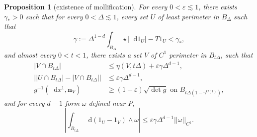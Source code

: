 \documentclass[reqno,12pt,letterpaper]{amsart}
\newcommand*\dif{\mathop{}\!\mathrm{d}}
\newcommand{\normal}{\mathbf n}
\newtheorem{proposition}[theorem]{Proposition}
\theoremstyle{definition}
\numberwithin{equation}{section}
\begin{document}
\begin{proposition}[existence of mollification]\label{mollifier quant}
For every $0 < \varepsilon \lesssim 1$, there exists $\gamma_* > 0$ such that for every $0 < \Delta \lesssim 1$, every set $U$ of least perimeter in $B_\Delta$ such that
\begin{equation}\label{bootstrap the mollifier}
\gamma := \Delta^{1 - d} \int_{B_\Delta} \star |\dif 1_U| - T1_U < \gamma_*,
\end{equation}
and almost every $0 < t < 1$, there exists a set $V$ of $C^1$ perimeter in $B_{t\Delta}$, such that
\begin{align}
|V \cap B_{t\Delta}| &\leq \eta(V, t\Delta) + \varepsilon \gamma \Delta^{d - 1}, \label{mollifier quant1}\\
\left||U \cap B_{t\Delta}| - |V \cap B_{t\Delta}|\right| &\leq \varepsilon \gamma \Delta^{d - 1}, \label{mollifier quant2}\\
g^{-1}(\dif x^1, \normal_V) &\geq (1 - \varepsilon)\sqrt{\det g} \text{ on } B_{t\Delta(1 - \gamma^{O(1)})}, \label{mollifier quant4}
\end{align}
and for every $d-1$-form $\omega$ defined near $P$,
\begin{equation}
\left|\int_{B_{t\Delta}} \dif(1_U - 1_V) \wedge \omega\right| \leq \varepsilon \gamma \Delta^{d - 1} ||\omega||_{C^1}. \label{mollifier quant3}
\end{equation}
\end{proposition}
\end{document}

